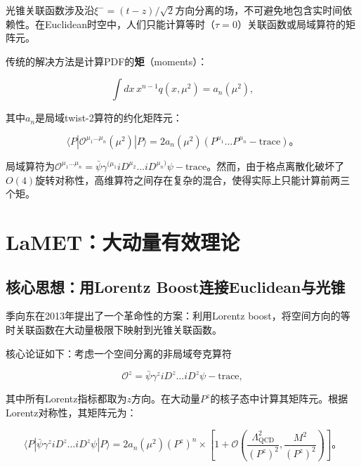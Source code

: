 \documentclass[12pt,a4paper]{ctexart}
\theoremstyle{definition}
\begin{document}
光锥关联函数涉及沿$\xi^- = (t-z)/\sqrt{2}$方向分离的场，不可避免地包含实时间依赖性。在Euclidean时空中，人们只能计算等时（$\tau = 0$）关联函数或局域算符的矩阵元。

传统的解决方法是计算PDF的\textbf{矩}（moments）\cite{Ji2013Euclidean}：

\begin{equation}
\int dx\, x^{n-1} q(x, \mu^2) = a_n(\mu^2),
\label{eq:moments}
\end{equation}

其中$a_n$是局域twist-2算符的约化矩阵元：

\begin{equation}
\langle P| \mathcal{O}^{\mu_1\ldots\mu_n}(\mu^2) |P\rangle = 2a_n(\mu^2)(P^{\mu_1}\ldots P^{\mu_n} - \text{trace})。
\label{eq:local_operators}
\end{equation}

局域算符为$\mathcal{O}^{\mu_1\ldots\mu_n} = \bar{\psi}\gamma^{(\mu_1}iD^{\mu_2}\ldots iD^{\mu_n)}\psi - \text{trace}$。然而，由于格点离散化破坏了$O(4)$旋转对称性，高维算符之间存在复杂的混合，使得实际上只能计算前两三个矩\cite{Ji2013Euclidean}。

\section{LaMET：大动量有效理论}

\subsection{核心思想：用Lorentz Boost连接Euclidean与光锥}

季向东在2013年提出了一个革命性的方案\cite{Ji2013Euclidean}：利用Lorentz boost，将空间方向的等时关联函数在大动量极限下映射到光锥关联函数。

核心论证如下\cite{Ji2013Euclidean}：考虑一个空间分离的非局域夸克算符

\begin{equation}
\mathcal{O}^z = \bar{\psi}\gamma^z iD^z\ldots iD^z\psi - \text{trace},
\label{eq:spatial_operator}
\end{equation}

其中所有Lorentz指标都取为$z$方向。在大动量$P^z$的核子态中计算其矩阵元。根据Lorentz对称性，其矩阵元为：

\begin{equation}
\langle P| \bar{\psi}\gamma^z iD^z\ldots iD^z\psi |P\rangle = 2a_n(\mu^2)(P^z)^n \times \left[1 + \mathcal{O}\left(\frac{\Lambda_{\text{QCD}}^2}{(P^z)^2}, \frac{M^2}{(P^z)^2}\right)\right]。
\label{eq:spatial_ME}
\end{equation}
\end{document}
